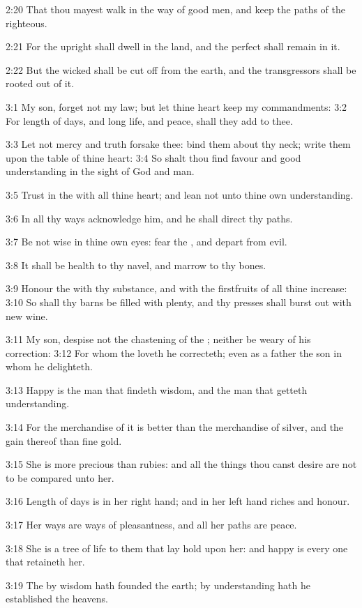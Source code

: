 2:20 That thou mayest walk in the way of good men, and keep the paths of the righteous.

2:21 For the upright shall dwell in the land, and the perfect shall remain in it.

2:22 But the wicked shall be cut off from the earth, and the transgressors shall be rooted out of it.

3:1 My son, forget not my law; but let thine heart keep my commandments: 3:2 For length of days, and long life, and peace, shall they add to thee.

3:3 Let not mercy and truth forsake thee: bind them about thy neck; write them upon the table of thine heart: 3:4 So shalt thou find favour and good understanding in the sight of God and man.

3:5 Trust in the \LORD with all thine heart; and lean not unto thine own understanding.

3:6 In all thy ways acknowledge him, and he shall direct thy paths.

3:7 Be not wise in thine own eyes: fear the \LORD, and depart from evil.

3:8 It shall be health to thy navel, and marrow to thy bones.

3:9 Honour the \LORD with thy substance, and with the firstfruits of all thine increase: 3:10 So shall thy barns be filled with plenty, and thy presses shall burst out with new wine.

3:11 My son, despise not the chastening of the \LORD; neither be weary of his correction: 3:12 For whom the \LORD loveth he correcteth; even as a father the son in whom he delighteth.

3:13 Happy is the man that findeth wisdom, and the man that getteth understanding.

3:14 For the merchandise of it is better than the merchandise of silver, and the gain thereof than fine gold.

3:15 She is more precious than rubies: and all the things thou canst desire are not to be compared unto her.

3:16 Length of days is in her right hand; and in her left hand riches and honour.

3:17 Her ways are ways of pleasantness, and all her paths are peace.

3:18 She is a tree of life to them that lay hold upon her: and happy is every one that retaineth her.

3:19 The \LORD by wisdom hath founded the earth; by understanding hath he established the heavens.

